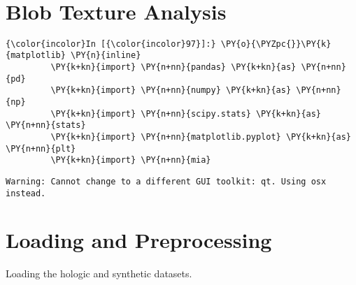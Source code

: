    \begin{center}
    \end{center}
    { \hspace*{\fill} \\}


\section*{Blob Texture Analysis}
    


    \begin{Verbatim}[commandchars=\\\{\}]
{\color{incolor}In [{\color{incolor}97}]:} \PY{o}{\PYZpc{}}\PY{k}{matplotlib} \PY{n}{inline}
         \PY{k+kn}{import} \PY{n+nn}{pandas} \PY{k+kn}{as} \PY{n+nn}{pd}
         \PY{k+kn}{import} \PY{n+nn}{numpy} \PY{k+kn}{as} \PY{n+nn}{np}
         \PY{k+kn}{import} \PY{n+nn}{scipy.stats} \PY{k+kn}{as} \PY{n+nn}{stats}
         \PY{k+kn}{import} \PY{n+nn}{matplotlib.pyplot} \PY{k+kn}{as} \PY{n+nn}{plt}
         \PY{k+kn}{import} \PY{n+nn}{mia}
\end{Verbatim}

    \begin{Verbatim}[commandchars=\\\{\}]
Warning: Cannot change to a different GUI toolkit: qt. Using osx instead.
    \end{Verbatim}

    \section{Loading and Preprocessing}\label{loading-and-preprocessing}

    Loading the hologic and synthetic datasets.

